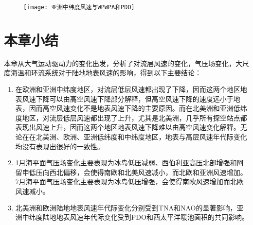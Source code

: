 \begin{figure}[!b]
    \centering
    \texttt{[image: 亚洲中纬度风速与WPWPA和PDO]}
    \label{fig:ASwindspeedPDOandWPWPA}
\end{figure}

\section{本章小结}

本章从大气运动驱动力的变化出发，分析了对流层风速的变化，气压场变化，大尺度海温和环流系统对于陆地地表风速的影响，得到以下主要结论：

\begin{enumerate}

\item 在欧洲和亚洲中纬度地区，对流层低层风速都出现了下降，因而这两个地区地表风速下降可以由高空风速下降部分解释，但高空风速下降的速度远小于地表，因而高空风速变化不是地表风速下降的主要原因。而在北美洲和亚洲低纬度地区，对流层低层风速都出现了上升，尤其是北美洲，几乎所有探空站点都表现出风速上升，因而这两个地区地表风速下降难以由高空风速变化解释。无论在在北美洲、欧洲、亚洲低纬度和中纬度地区，地表与高层风速年代际变化均没有表现出很好的一致性。

\item 1月海平面气压场变化主要表现为冰岛低压减弱、西伯利亚高压北部增强和阿留申低压向西北偏移，会使得南欧和北美风速减小，而北欧和亚洲风速增加。7月海平面气压场变化主要表现为冰岛低压增强，会使得南欧风速增加而北欧风速减小。

\item 北美洲和欧洲陆地地表风速年代际变化分别受到TNA和NAO的显著影响，亚洲中纬度陆地地表风速年代际变化受到PDO和西太平洋暖池面积的共同影响。

\end{enumerate}